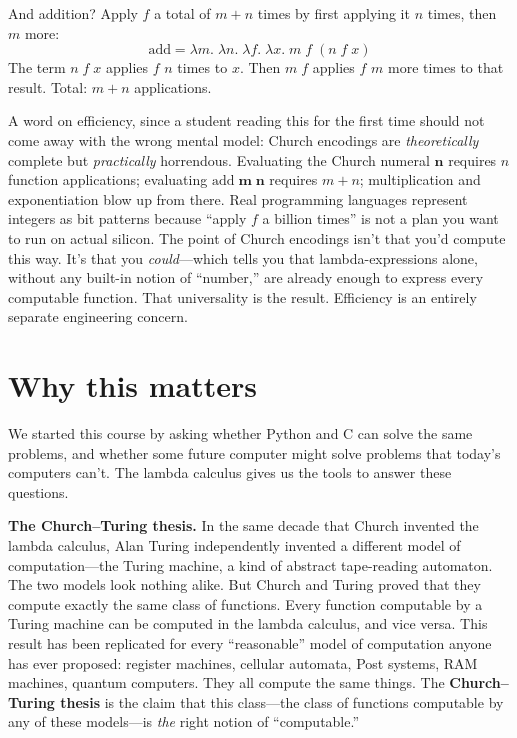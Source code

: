 \documentclass[11pt]{article}
\begin{document}
And addition? Apply $f$ a total of $m + n$ times by first applying it $n$ times, then $m$ more:
\[
\text{add} = \lambda m.\; \lambda n.\; \lambda f.\; \lambda x.\; m\; f\;(n\; f\; x)
\]
The term $n\; f\; x$ applies $f$ $n$ times to $x$. Then $m\; f$ applies $f$ $m$ more times to that result. Total: $m + n$ applications.

\medskip
\noindent A word on efficiency, since a student reading this for the first time should not come away with the wrong mental model: Church encodings are \emph{theoretically} complete but \emph{practically} horrendous. Evaluating the Church numeral $\mathbf{n}$ requires $n$ function applications; evaluating $\text{add}\;\mathbf{m}\;\mathbf{n}$ requires $m + n$; multiplication and exponentiation blow up from there. Real programming languages represent integers as bit patterns because ``apply $f$ a billion times'' is not a plan you want to run on actual silicon. The point of Church encodings isn't that you'd compute this way. It's that you \emph{could}---which tells you that lambda-expressions alone, without any built-in notion of ``number,'' are already enough to express every computable function. That universality is the result. Efficiency is an entirely separate engineering concern.

\section{Why this matters}

We started this course by asking whether Python and C can solve the same problems, and whether some future computer might solve problems that today's computers can't. The lambda calculus gives us the tools to answer these questions.

\textbf{The Church--Turing thesis.} In the same decade that Church invented the lambda calculus, Alan Turing independently invented a different model of computation---the Turing machine, a kind of abstract tape-reading automaton. The two models look nothing alike. But Church and Turing proved that they compute exactly the same class of functions. Every function computable by a Turing machine can be computed in the lambda calculus, and vice versa. This result has been replicated for every ``reasonable'' model of computation anyone has ever proposed: register machines, cellular automata, Post systems, RAM machines, quantum computers. They all compute the same things. The \textbf{Church--Turing thesis} is the claim that this class---the class of functions computable by any of these models---is \emph{the} right notion of ``computable.''
\end{document}
